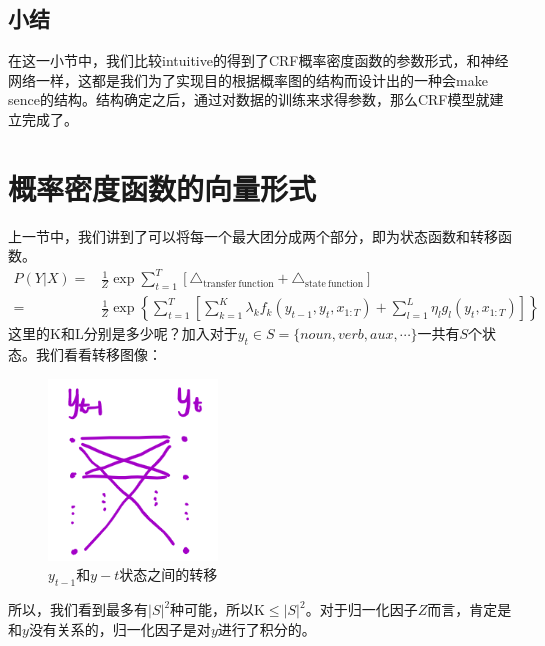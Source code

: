\documentclass[a4paper]{article}
\begin{document}
\subsection{小结}
在这一小节中，我们比较intuitive的得到了CRF概率密度函数的参数形式，和神经网络一样，这都是我们为了实现目的根据概率图的结构而设计出的一种会make sence的结构。结构确定之后，通过对数据的训练来求得参数，那么CRF模型就建立完成了。

\section{概率密度函数的向量形式}
上一节中，我们讲到了可以将每一个最大团分成两个部分，即为状态函数和转移函数。
\begin{equation}
    \begin{split}
        P(Y|X) = & \frac{1}{Z} \exp\sum_{t=1}^T [\triangle_{\mathrm{transfer\ function}}+\triangle_{\mathrm{state\ function}}] \\
        = & \frac{1}{Z} \exp \left\{ \sum_{t=1}^T \left[ \sum_{k=1}^K \lambda_k f_k(y_{t-1},y_t,x_{1:T}) + \sum_{l=1}^L \eta_l g_l(y_t,x_{1:T}) \right] \right\}
    \end{split}
\end{equation}
这里的K和L分别是多少呢？加入对于$y_t \in S = \{noun,verb,aux,\cdots\}$一共有$S$个状态。我们看看转移图像：
\begin{figure}[H]
    \centering
    \includegraphics[width=.25\textwidth]{微信图片_20200223151838.png}
    \caption{$y_{t-1}$和$y-t$状态之间的转移}
    \label{fig:my_label_1}
\end{figure}
所以，我们看到最多有$|S|^2$种可能，所以$\mathrm{K}\leq |S|^2$。对于归一化因子$Z$而言，肯定是和$y$没有关系的，归一化因子是对$y$进行了积分的。
\end{document}
